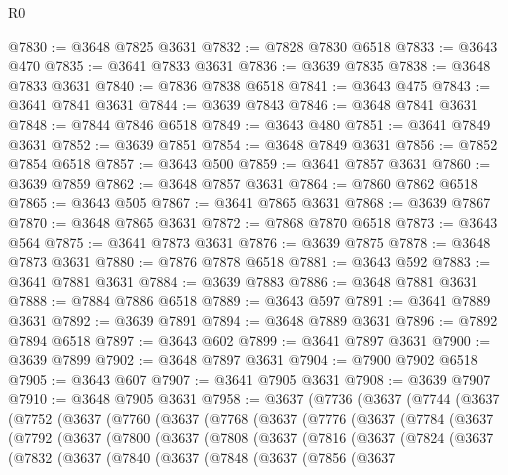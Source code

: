 \begin{lexlean}{R0}
\begin{coremodule}
@7830 := @3648 @7825 @3631
@7832 := @7828 @7830 @6518
@7833 := @3643 @470
@7835 := @3641 @7833 @3631
@7836 := @3639 @7835
@7838 := @3648 @7833 @3631
@7840 := @7836 @7838 @6518
@7841 := @3643 @475
@7843 := @3641 @7841 @3631
@7844 := @3639 @7843
@7846 := @3648 @7841 @3631
@7848 := @7844 @7846 @6518
@7849 := @3643 @480
@7851 := @3641 @7849 @3631
@7852 := @3639 @7851
@7854 := @3648 @7849 @3631
@7856 := @7852 @7854 @6518
@7857 := @3643 @500
@7859 := @3641 @7857 @3631
@7860 := @3639 @7859
@7862 := @3648 @7857 @3631
@7864 := @7860 @7862 @6518
@7865 := @3643 @505
@7867 := @3641 @7865 @3631
@7868 := @3639 @7867
@7870 := @3648 @7865 @3631
@7872 := @7868 @7870 @6518
@7873 := @3643 @564
@7875 := @3641 @7873 @3631
@7876 := @3639 @7875
@7878 := @3648 @7873 @3631
@7880 := @7876 @7878 @6518
@7881 := @3643 @592
@7883 := @3641 @7881 @3631
@7884 := @3639 @7883
@7886 := @3648 @7881 @3631
@7888 := @7884 @7886 @6518
@7889 := @3643 @597
@7891 := @3641 @7889 @3631
@7892 := @3639 @7891
@7894 := @3648 @7889 @3631
@7896 := @7892 @7894 @6518
@7897 := @3643 @602
@7899 := @3641 @7897 @3631
@7900 := @3639 @7899
@7902 := @3648 @7897 @3631
@7904 := @7900 @7902 @6518
@7905 := @3643 @607
@7907 := @3641 @7905 @3631
@7908 := @3639 @7907
@7910 := @3648 @7905 @3631
@7958 := @3637
    (@7736
      (@3637
        (@7744
          (@3637
            (@7752
              (@3637
                (@7760
                  (@3637
                    (@7768
                      (@3637
                        (@7776
                          (@3637
                            (@7784
                              (@3637
                                (@7792
                                  (@3637
                                    (@7800
                                      (@3637
                                        (@7808
                                          (@3637
                                            (@7816
                                              (@3637
                                                (@7824
                                                  (@3637
                                                    (@7832
                                                      (@3637
                                                        (@7840
                                                          (@3637
                                                            (@7848
                                                              (@3637
                                                                (@7856
                                                                  (@3637

\end{coremodule}
\end{lexlean}
